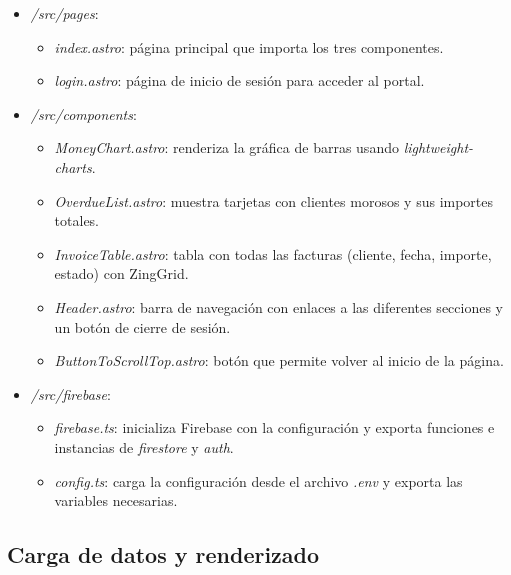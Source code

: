 \begin{large}
\begin{itemize}
  \item \textit{/src/pages}:
    \begin{itemize}
      \item \textit{index.astro}: página principal que importa los tres componentes.
      \item \textit{login.astro}: página de inicio de sesión para acceder al portal.
    \end{itemize}
  \item \textit{/src/components}:
    \begin{itemize}
      \item \textit{MoneyChart.astro}: renderiza la gráfica de barras usando \emph{lightweight-charts}.
      \item \textit{OverdueList.astro}: muestra tarjetas con clientes morosos y sus importes totales.
      \item \textit{InvoiceTable.astro}: tabla con todas las facturas (cliente, fecha, importe, estado) con ZingGrid.
			\item \textit{Header.astro}: barra de navegación con enlaces a las diferentes secciones y un botón de cierre de sesión.
			\item \textit{ButtonToScrollTop.astro}: botón que permite volver al inicio de la página.
    \end{itemize}
  \item \textit{/src/firebase}:
    \begin{itemize}
      \item \textit{firebase.ts}: inicializa Firebase con la configuración y exporta funciones e instancias de \textit{firestore} y \textit{auth}.
      \item \textit{config.ts}: carga la configuración desde el archivo \textit{.env} y exporta las variables necesarias.
    \end{itemize}
\end{itemize}

\end{large}

\subsection{Carga de datos y renderizado}

